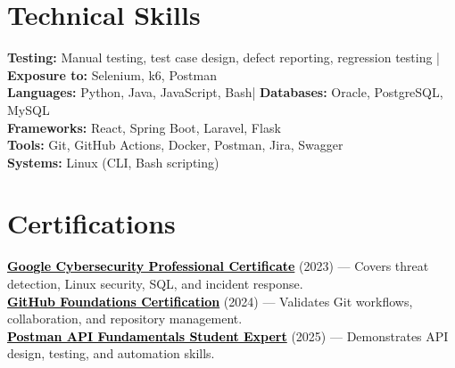 \documentclass[a4paper]{article}
\begin{document}
\section{Technical Skills}
\begin{itemize}[leftmargin=0.15in, label={}]
\small{\item{
\textbf{Testing:} Manual testing, test case design, defect reporting, regression testing \;|\; \textbf{Exposure to:} Selenium, k6, Postman\\
\textbf{Languages:} Python, Java, JavaScript, Bash\;|\;
\textbf{Databases:} Oracle, PostgreSQL, MySQL\\
\textbf{Frameworks:} React, Spring Boot, Laravel, Flask\\
\textbf{Tools:} Git, GitHub Actions, Docker, Postman, Jira, Swagger\\
\textbf{Systems:} Linux (CLI, Bash scripting)
}}
\end{itemize}




\section{Certifications}
 \begin{itemize}[leftmargin=0.15in, label={}]
    \small{\item{
    \href{https://coursera.org/share/44fd8f381cb39ac45892569cdf6f7674}{\textcolor{black}{\textbf{Google Cybersecurity Professional Certificate}}} (2023) --- Covers threat detection, Linux security, SQL, and incident response. \\
    \href{https://www.credly.com/badges/d5c30c19-02db-4c5f-9bc9-4bd0f4b6a89e/public_url}{\textcolor{black}{\textbf{GitHub Foundations Certification}}} (2024) --- Validates Git workflows, collaboration, and repository management. \\
    \href{https://badges.parchment.com/public/assertions/ZF0yx-i3T1CvXYwDLEUneA?identity__email=sakib.sadman.badhon\%40g.bracu.ac.bd}{\textcolor{black}{\textbf{Postman API Fundamentals Student Expert}}} (2025) --- Demonstrates API design, testing, and automation skills.
    }}
 \end{itemize}


\end{document}
